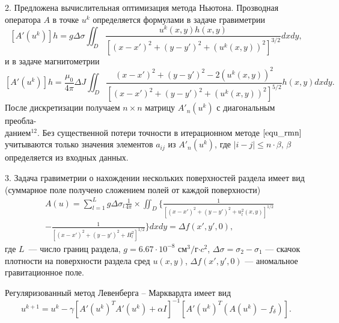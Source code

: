 \documentclass[%
autoref,     %
href,        %
colorlinks,  %
]{disser}
\begin{document}
2. Предложена вычислительная оптимизация метода Ньютона. Прозводная оператора $A$ в точке $u^k$ определяется формулами в задаче гравиметрии
$$ [A'(u^k)]h=g\Delta\sigma\iint_{D} \frac{u^k(x,y)h(x,y)}{[(x-x')^2+(y-y')^2+(u^k(x,y))^2]^{3/2}}dxdy,$$
и в задаче магнитометрии
$$ [A'(u^k)]h=\frac{\mu_0}{4\pi}\Delta J\iint_{D} \frac{(x-x')^2+(y-y')^2-2(u^k(x,y))^2}{[(x-x')^2+(y-y')^2+(u^k(x,y))^2]^{5/2}}h(x,y) dxdy.$$
После дискретизации получаем $n\times n$ матрицу $A'_n(u^k)$ с диагональным преобла-\\данием$^{12}$. Без существенной потери точности в итерационном методе $\eqref{equ_rmn}$ учитываются только значения элементов $a_{ij}$ из $A'_n(u^k)$, где $|i-j|\leqslant n\cdot\beta$, $\beta$ определяется из входных данных.
{\scriptsize
	\let\thefootnote\relax\let\thefootnote\relax{}
	}

3. Задача гравиметрии о нахождении нескольких поверхностей раздела имеет вид (суммарное поле получено сложением полей от каждой поверхности)
\begin{equation}\label{equ_grav_multi}
		\begin{aligned}
		& A(u)=\sum_{l=1}^{L}g\Delta\sigma_l\frac{1}{4\pi}\times 
		\iint_D\bigg\{\frac{1}{[(x-x')^2+(y-y')^2+u_l^2(x,y)]^{1/2}} \\
		&-\frac{1}{[(x-x')^2+(y-y')^2+H_l^2]^{1/2}}\bigg\}dxdy=\Delta f(x',y',0),
		\end{aligned}
\end{equation}		
где $L$~--- число границ раздела, $g=6.67\cdot10^{-8}$ см$^3/$г$\cdot c^2$, $\Delta\sigma=\sigma_2-\sigma_1$ --- скачок плотности на поверхности раздела сред $u(x,y)$, $\Delta f(x',y',0)$ --- аномальное гравитационное поле.

Регуляризованный метод Левенберга -- Марквардта имеет вид 
$$u^{k+1}=u^k-\gamma[A'(u^k)^T A'(u^k)+\alpha I]^{-1} [A'(u^k)^T(A(u^k)-f_\delta)].$$
\end{document}

